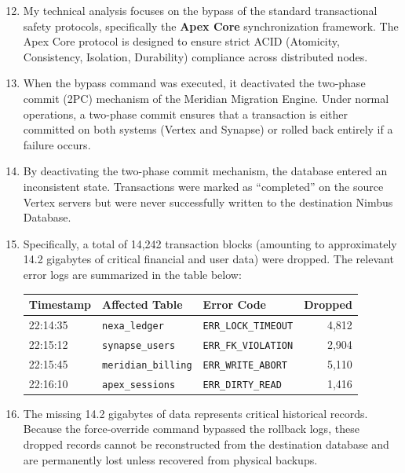 \documentclass[12pt,letterpaper]{article}
\begin{document}
\begin{enumerate}[label=\arabic*., leftmargin=0.4in, rightmargin=0.1in, align=left]
  \setcounter{enumi}{11}
  \item My technical analysis focuses on the bypass of the standard transactional safety protocols, specifically the \textbf{Apex Core} synchronization framework. The Apex Core protocol is designed to ensure strict ACID (Atomicity, Consistency, Isolation, Durability) compliance across distributed nodes.
  
  \item When the bypass command was executed, it deactivated the two-phase commit (2PC) mechanism of the Meridian Migration Engine. Under normal operations, a two-phase commit ensures that a transaction is either committed on both systems (Vertex and Synapse) or rolled back entirely if a failure occurs.
  
  \item By deactivating the two-phase commit mechanism, the database entered an inconsistent state. Transactions were marked as ``completed'' on the source Vertex servers but were never successfully written to the destination Nimbus Database.
  
  \item Specifically, a total of 14,242 transaction blocks (amounting to approximately 14.2 gigabytes of critical financial and user data) were dropped. The relevant error logs are summarized in the table below:
  
  \par\vspace{0.8em}
  \noindent
  \begin{minipage}{\textwidth}
    \centering
    \small
    \begin{tabularx}{\textwidth}{l X l r}
      \toprule
      \textbf{Timestamp} & \textbf{Affected Table} & \textbf{Error Code} & \textbf{Dropped} \\
      \midrule
      22:14:35 & \texttt{nexa\_ledger} & \texttt{ERR\_LOCK\_TIMEOUT} & 4,812 \\
      22:15:12 & \texttt{synapse\_users} & \texttt{ERR\_FK\_VIOLATION} & 2,904 \\
      22:15:45 & \texttt{meridian\_billing} & \texttt{ERR\_WRITE\_ABORT} & 5,110 \\
      22:16:10 & \texttt{apex\_sessions} & \texttt{ERR\_DIRTY\_READ} & 1,416 \\
      \bottomrule
    \end{tabularx}
  \end{minipage}
  \par\vspace{1.0em}
  
  \item The missing 14.2 gigabytes of data represents critical historical records. Because the force-override command bypassed the rollback logs, these dropped records cannot be reconstructed from the destination database and are permanently lost unless recovered from physical backups.
\end{enumerate}
\end{document}
